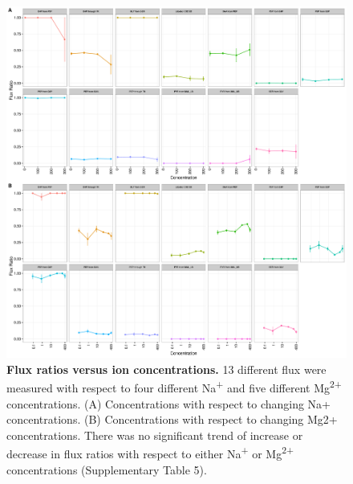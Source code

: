 \documentclass[a4paper]{article}
\begin{document}
\clearpage
\begin{figure}[!htb]
	\includegraphics[width=1\textwidth]{../supplementary_figures/figS2_FluxExp.pdf}
	\caption[Flux ratios versus ion concentrations]
	{\textbf{Flux ratios versus ion concentrations.} 13 different flux were measured with respect to four different Na\textsuperscript{+} and five different Mg\textsuperscript{2+} concentrations. (A) Concentrations with respect to changing Na+ concentrations. (B) Concentrations with respect to changing Mg2+ concentrations. There was no significant trend of increase or decrease in flux ratios with respect to either Na\textsuperscript{+} or Mg\textsuperscript{2+} concentrations (Supplementary Table 5).}
\end{figure}
\end{document}
